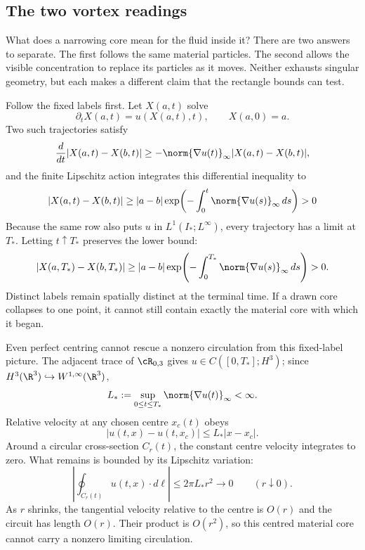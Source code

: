 \subsection{The two vortex readings}\label{sub:ClosingCriticalHeightZenoAndTheVortex}

What does a narrowing core mean for the fluid inside it?
There are two answers to separate.  The first follows the same material
particles.  The second allows the visible concentration to replace its
particles as it moves.  Neither exhausts singular geometry, but each makes a
different claim that the rectangle bounds can test.

Follow the fixed labels first.
Let \(X(a,t)\) solve
\[
  \partial_tX(a,t)=u(X(a,t),t),
  \qquad
  X(a,0)=a.
\]
Two such trajectories satisfy
\[
  \frac d{dt}|X(a,t)-X(b,t)|
  \geq
  -\norm{\nabla u(t)}_\infty|X(a,t)-X(b,t)|,
\]
and the finite Lipschitz action integrates this differential inequality to
\begin{equation}\label{eq:BodyMaterialCoreLowerBound}
  |X(a,t)-X(b,t)|
  \geq
  |a-b|
  \exp\!\left(
    -\int_0^t\norm{\nabla u(s)}_\infty\,ds
  \right)
  >0
\end{equation}
Because the same row also puts \(u\) in \(L^1(I_*;L^\infty)\), every trajectory
has a limit at \(T_*\).  Letting \(t\uparrow T_*\) preserves the lower bound:
\[
  |X(a,T_*)-X(b,T_*)|
  \geq |a-b|\exp\!\left(-\int_0^{T_*}\norm{\nabla u(s)}_\infty\,ds\right)>0.
\]
Distinct labels remain spatially distinct at the terminal time.
If a drawn core collapses to one point, it cannot still contain exactly the
material core with which it began.

Even perfect centring cannot rescue a nonzero circulation from this fixed-label
picture.  The adjacent trace of \(\cR_{0,3}\) gives
\(u\in C([0,T_*];H^3)\); since \(H^3(\R^3)\hookrightarrow
W^{1,\infty}(\R^3)\),
\begin{equation}\label{eq:BodyUniformLipschitzBound}
  L_*:=\sup_{0\leq t\leq T_*}\norm{\nabla u(t)}_\infty<\infty.
\end{equation}
Relative velocity at any chosen centre \(x_c(t)\) obeys
\[
  |u(t,x)-u(t,x_c)|\leq L_*|x-x_c|.
\]
Around a circular cross-section \(C_r(t)\), the constant centre velocity
integrates to zero.  What remains is bounded by its Lipschitz variation:
\begin{equation}\label{eq:BodyCenteredCirculationBound}
  \left|
    \oint_{C_r(t)}u(t,x)\cdot d\ell
  \right|
  \leq2\pi L_*r^2
  \longrightarrow0
  \qquad(r\downarrow0).
\end{equation}
As \(r\) shrinks, the tangential velocity relative to the centre is \(O(r)\)
and the circuit has length \(O(r)\).  Their product is \(O(r^2)\), so this
centred material core cannot carry a nonzero limiting circulation.

